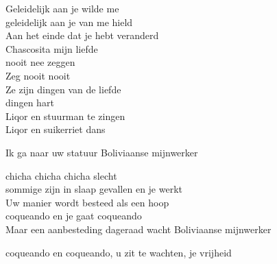 \clearpage
\begin{translation}
Geleidelijk aan je wilde me\\
geleidelijk aan je van me hield\\
Aan het einde dat je hebt veranderd\\
Chascosita mijn liefde\\
nooit nee zeggen\\
Zeg nooit nooit\\
Ze zijn dingen van de liefde\\
dingen hart\\
Liqor en stuurman te zingen\\
Liqor en suikerriet dans
\end{translation}

\begin{translation}
Ik ga naar uw statuur Boliviaanse mijnwerker\vspace{2em}

chicha chicha chicha slecht\\
sommige zijn in slaap gevallen en je werkt\\
Uw manier wordt besteed als een hoop\\
coqueando en je gaat coqueando\\
Maar een aanbesteding dageraad wacht Boliviaanse mijnwerker\vspace{2em}

coqueando en coqueando, u zit te wachten, je vrijheid
\end{translation}
